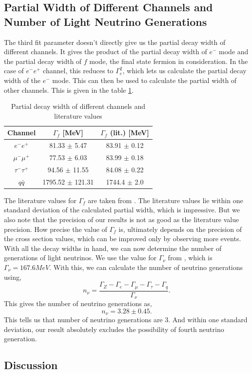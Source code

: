 \subsection{Partial Width of Different Channels and Number of Light Neutrino Generations}
The third fit parameter doesn't directly give us the partial decay width of different channels. It gives the product of the partial decay width of $e^-$ mode and the partial decay width of $f$ mode, the final state fermion in consideration. In the case of $e^-e^+$ channel, this reduces to $\Gamma_e^2$, which lets us calculate the partial decay width of the $e^-$ mode. This can then be used to calculate the partial width of other channels. This is given in the table \ref{table:decaywidth}.\\
\begin{table}[h!]
\centering
\begin{tabular}{c|cc}
\hline
Channel        & $\Gamma_f$ {[}MeV{]} & $\Gamma_f$ (lit.) {[}MeV{]} \\ \hline
$e^-e^+$       & 81.33 $\pm$ 5.47     & 83.91 $\pm$ 0.12              \\
$\mu^-\mu^+$   & 77.53 $\pm$ 6.03     & 83.99 $\pm$ 0.18              \\
$\tau^-\tau^+$ & 94.56 $\pm$ 11.55    & 84.08 $\pm$ 0.22              \\
$q\bar{q}$     & 1795.52 $\pm$ 121.31 & 1744.4 $\pm$ 2.0              \\ \hline
\end{tabular}
\caption{Partial decay width of different channels and literature values}
\label{table:decaywidth}
\end{table}
The literature values for $\Gamma_f$ are taken from \cite{pdg2}. The literature values lie within one standard deviation of the calculated partial width, which is impressive. But we also note that the precision of our results is not as good as the literature value precision. How precise the value of $\Gamma_f$ is, ultimately depends on the precision of the cross section values, which can be improved only by observing more events.\\
With all the decay widths in hand, we can now determine the number of generations of light neutrinos. We use the value for $\Gamma_{\nu}$ from \cite{UB}, which is $\Gamma_{\nu} = 167.6 MeV$. With this, we can calculate the number of neutrino generations using,
\begin{equation}
    n_{\nu} = \frac{\Gamma_Z - \Gamma_e - \Gamma_{\mu} - \Gamma_{\tau} - \Gamma_q}{\Gamma_{\nu}}.
\end{equation}
This gives the number of neutrino generations as,
\begin{equation}
    n_{\nu} = 3.28 \pm 0.45.
\end{equation}
This tells us that number of neutrino generations are $3$. And within one standard deviation, our result absolutely excludes the possibility of fourth neutrino generation.

\subsection{Discussion}